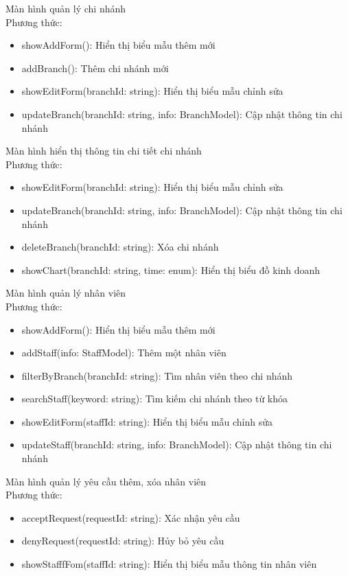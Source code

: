Màn hình quản lý chi nhánh\\ 
Phương thức:
\begin{itemize}
	\item showAddForm(): Hiển thị biểu mẫu thêm mới
	\item addBranch(): Thêm chi nhánh mới
	\item showEditForm(branchId: string): Hiển thị biểu mẫu chỉnh sửa
	\item updateBranch(branchId: string, info: BranchModel): Cập nhật thông tin chi nhánh
\end{itemize}

Màn hình hiển thị thông tin chi tiết chi nhánh\\ 
Phương thức:
\begin{itemize}
	\item showEditForm(branchId: string): Hiển thị biểu mẫu chỉnh sửa
	\item updateBranch(branchId: string, info: BranchModel): Cập nhật thông tin chi nhánh
	\item deleteBranch(branchId: string): Xóa chi nhánh
	\item showChart(branchId: string, time: enum): Hiển thị biểu đồ kinh doanh 
\end{itemize}

Màn hình quản lý nhân viên\\ 
Phương thức:
\begin{itemize}
	\item showAddForm(): Hiển thị biểu mẫu thêm mới
	\item addStaff(info: StaffModel): Thêm một nhân viên
	\item filterByBranch(branchId: string): Tìm nhân viên theo chi nhánh
	\item searchStaff(keyword: string): Tìm kiếm chi nhánh theo từ khóa
	\item showEditForm(staffId: string): Hiển thị biểu mẫu chỉnh sửa
	\item updateStaff(branchId: string, info: BranchModel): Cập nhật thông tin chi nhánh
\end{itemize}

Màn hình quản lý yêu cầu thêm, xóa nhân viên\\ 
Phương thức:
\begin{itemize}
	\item acceptRequest(requestId: string): Xác nhận yêu cầu
	\item denyRequest(requestId: string): Hủy bỏ yêu cầu
	\item showStafffFom(staffId: string): Hiển thị biểu mẫu thông tin nhân viên
\end{itemize}


